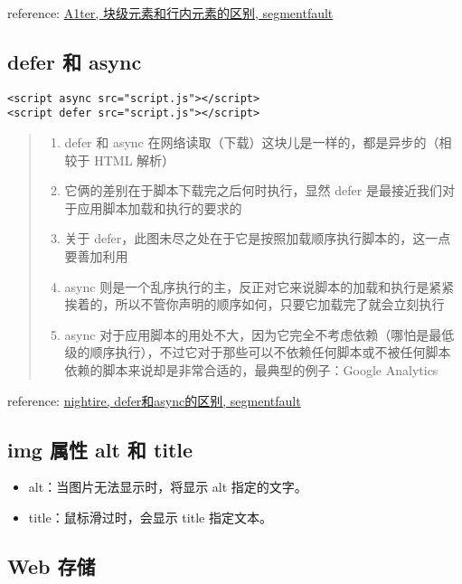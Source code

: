 reference: \href{http://segmentfault.com/a/1190000003714074}{A1ter, 块级元素和行内元素的区别, segmentfault}

\subsection{defer 和 async}\hypertarget{defer--async}{}\label{defer--async}

\begin{verbatim}<script async src="script.js"></script>
<script defer src="script.js"></script>
\end{verbatim}

\begin{quote}
\begin{enumerate}
\item defer 和 async 在网络读取（下载）这块儿是一样的，都是异步的（相较于 HTML 解析）
\item 它俩的差别在于脚本下载完之后何时执行，显然 defer 是最接近我们对于应用脚本加载和执行的要求的
\item 关于 defer，此图未尽之处在于它是按照加载顺序执行脚本的，这一点要善加利用
\item async 则是一个乱序执行的主，反正对它来说脚本的加载和执行是紧紧挨着的，所以不管你声明的顺序如何，只要它加载完了就会立刻执行
\item async 对于应用脚本的用处不大，因为它完全不考虑依赖（哪怕是最低级的顺序执行），不过它对于那些可以不依赖任何脚本或不被任何脚本依赖的脚本来说却是非常合适的，最典型的例子：Google Analytics
\end{enumerate}
\end{quote}

reference: \href{http://segmentfault.com/q/1010000000640869/a-1020000000641029}{nightire, defer和async的区别, segmentfault}

\subsection{img 属性 alt 和 title}\hypertarget{img--alt--title}{}\label{img--alt--title}

\begin{itemize}
\item alt：当图片无法显示时，将显示 alt 指定的文字。
\item title：鼠标滑过时，会显示 title 指定文本。
\end{itemize}

\subsection{Web 存储}\hypertarget{web-}{}\label{web-}

